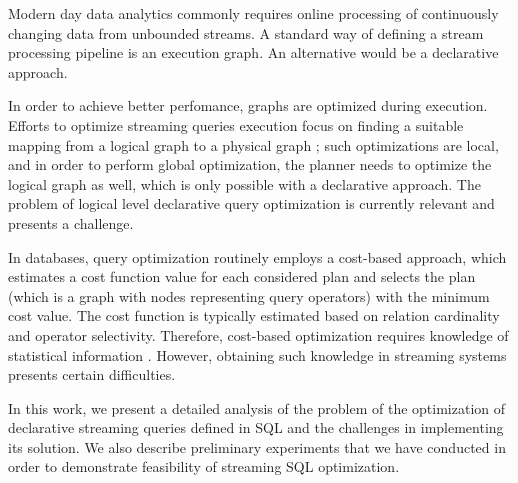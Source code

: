 \label {fs-optimization-introduction}

Modern day data analytics commonly requires online processing of continuously changing data from unbounded streams. A standard way of defining a stream processing pipeline is an execution graph. An alternative would be a declarative approach.

In order to achieve better perfomance, graphs are optimized during execution. Efforts to optimize streaming queries execution focus on finding a suitable mapping from a logical graph to a physical graph \cite{grulich2020grizzly, gedik2009code}; such optimizations are local, and in order to perform global optimization, the planner needs to optimize the logical graph as well, which is only possible with a declarative approach. The problem of logical level declarative query optimization is currently relevant and presents a challenge.

In databases, query optimization routinely employs a cost-based approach, which estimates a cost function value for each considered plan and selects the plan (which is a graph with nodes representing query operators) with the minimum cost value. The cost function is typically estimated based on relation cardinality and operator selectivity. Therefore, cost-based optimization requires knowledge of statistical information \cite{Neumann2018optimization}. However, obtaining such knowledge in streaming systems presents certain difficulties.

In this work, we present a detailed analysis of the problem of the optimization of declarative streaming queries defined in SQL and the challenges in implementing its solution. We also describe preliminary experiments that we have conducted in order to demonstrate feasibility of streaming SQL optimization.  
